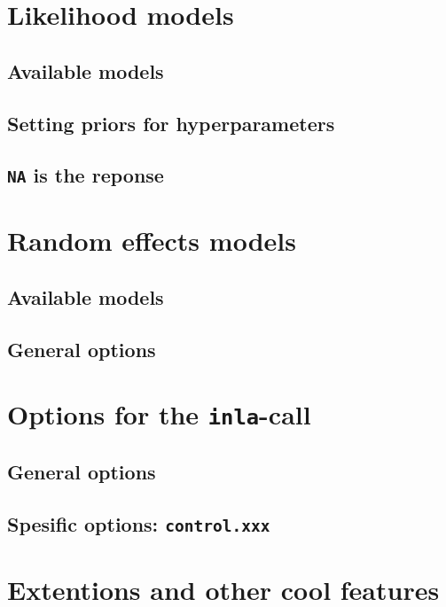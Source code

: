 \documentclass[a4paper,11pt]{report}
\newcommand{\tv}{\texttt}
\begin{document}
\chapter{Likelihood models}



\section{Available models}

\section{Setting priors for hyperparameters}

\section{\tv{NA} is the reponse}



\chapter{Random effects models}

\section{Available models}

\section{General options}



\chapter{Options for the \tv{inla}-call}

\section{General options}
\section{Spesific options: \tv{control.xxx}}



\chapter{Extentions and other cool features}
\end{document}
